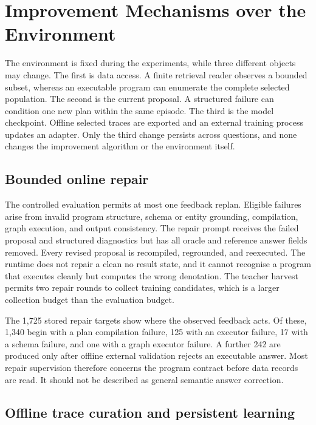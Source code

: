 \documentclass{article}
\begin{document}
\section{Improvement Mechanisms over the Environment}
\label{sec:mechanisms}

The environment is fixed during the experiments, while three different objects may change.  The
first is data access.  A finite retrieval reader observes a bounded subset, whereas an executable
program can enumerate the complete selected population.  The second is the current proposal.  A
structured failure can condition one new plan within the same episode.  The third is the model
checkpoint.  Offline selected traces are exported and an external training process updates an
adapter.  Only the third change persists across questions, and none changes the improvement
algorithm or the environment itself.

\subsection{Bounded online repair}

The controlled evaluation permits at most one feedback replan.  Eligible failures arise from
invalid program structure, schema or entity grounding, compilation, graph execution, and output
consistency.  The repair prompt receives the failed proposal and structured diagnostics but has all
oracle and reference answer fields removed.  Every revised proposal is recompiled, regrounded, and
reexecuted.  The runtime does not repair a clean no result state, and it cannot recognise a program
that executes cleanly but computes the wrong denotation.  The teacher harvest permits two repair
rounds to collect training candidates, which is a larger collection budget than the evaluation
budget.

The 1,725 stored repair targets show where the observed feedback acts.  Of these, 1,340 begin with
a plan compilation failure, 125 with an executor failure, 17 with a schema failure, and one with a
graph executor failure.  A further 242 are produced only after offline external validation rejects
an executable answer.  Most repair supervision therefore concerns the program contract before
data records are read.  It should not be described as general semantic answer correction.

\subsection{Offline trace curation and persistent learning}
\end{document}
